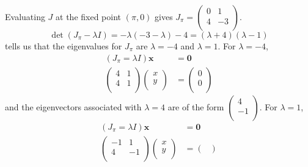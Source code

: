\documentclass[10pt]{article}
\begin{document}
\begin{enumerate}
      Evaluating $J$ at the fixed point $(\pi,0)$ gives
        $
          J_\pi = \begin{pmatrix}
            0 & 1 \\
            4 & -3 \\
          \end{pmatrix}
        $.
        $$\det(J_\pi - \lambda I) = -\lambda(-3-\lambda) - 4 = (\lambda +
        4)(\lambda - 1)$$ tells us that the eigenvalues for $J_\pi$ are $\lambda
        = -4$ and $\lambda = 1$. For $\lambda = -4$,
        \begin{align*}
          (J_\pi = \lambda I)\mathbf{x} &= \mathbf{0} \\
          \begin{pmatrix}
            4 & 1 \\
            4 & 1 \\
          \end{pmatrix}
          \begin{pmatrix}
            x \\
            y \\
          \end{pmatrix}
          &=
          \begin{pmatrix}
            0 \\
            0 \\
          \end{pmatrix}
        \end{align*}
        and the eigenvectors associated with $\lambda = 4$ are of the form $
          \begin{pmatrix}
            4 \\
            -1 \\
          \end{pmatrix}$.
        For $\lambda = 1$,
        \begin{align*}
          (J_\pi = \lambda I)\mathbf{x} &= \mathbf{0} \\
          \begin{pmatrix}
            -1 & 1 \\
            4 & -1 \\
          \end{pmatrix}
          \begin{pmatrix}
            x \\
            y \\
          \end{pmatrix}
          &=
          \begin{pmatrix}

\end{pmatrix}
\end{align*}
\end{enumerate}
\end{document}
